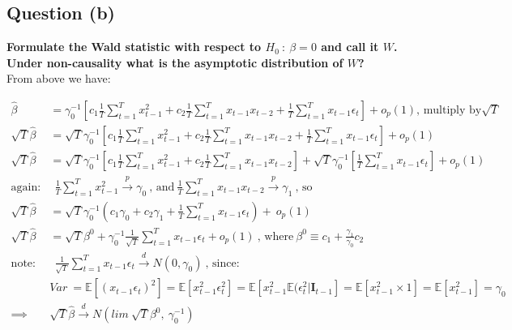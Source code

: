 \documentclass[11pt]{article}
\theoremstyle{definition}
\def\inprob{\stackrel{p}{\rightarrow}}
\def\indist{\stackrel{d}{\rightarrow}}
\begin{document}
\subsection{Question (b)}
\textbf{Formulate the Wald statistic with respect to $H_{0} \ : \ \beta=0$ and call it $W$.  Under non-causality what is the asymptotic distribution of $W$?} \\

From above we have:

\begin{equation*}
\begin{split}
\hat{\beta} & = \gamma_{0}^{-1}\left[c_{1}\frac{1}{T}\sum_{t=1}^{T}x_{t-1}^{2} + c_{2}\frac{1}{T}\sum_{t=1}^{T}x_{t-1}x_{t-2} + \frac{1}{T}\sum_{t=1}^{T}x_{t-1}\epsilon_{t}\right] + o_{p}(1) \text{, multiply by} \sqrt{T} \\
\sqrt{T}\hat{\beta} & =\sqrt{T} \gamma_{0}^{-1}\left[c_{1}\frac{1}{T}\sum_{t=1}^{T}x_{t-1}^{2} + c_{2}\frac{1}{T}\sum_{t=1}^{T}x_{t-1}x_{t-2} + \frac{1}{T}\sum_{t=1}^{T}x_{t-1}\epsilon_{t}\right] + o_{p}(1) \\
\sqrt{T}\hat{\beta} & =\sqrt{T} \gamma_{0}^{-1}\left[c_{1}\frac{1}{T}\sum_{t=1}^{T}x_{t-1}^{2} + c_{2}\frac{1}{T}\sum_{t=1}^{T}x_{t-1}x_{t-2} \right] + \sqrt{T} \gamma_{0}^{-1}\left[\frac{1}{T}\sum_{t=1}^{T}x_{t-1}\epsilon_{t}\right] + o_{p}(1) \\
 \text{again:} & \ \  \frac{1}{T}\sum_{t=1}^{T}x_{t-1}^{2} \inprob \gamma_{0} \ \text{, and} \  \frac{1}{T}\sum_{t=1}^{T}x_{t-1}x_{t-2} \inprob \gamma_{1} \ \text{, so} \\
\sqrt{T}\hat{\beta}  & = \sqrt{T}\gamma_{0}^{-1}\left(c_{1}\gamma_{0}+c_{2}\gamma_{1} + \frac{1}{T}\sum_{t=1}^{T}x_{t-1}\epsilon_{t}\right) + \ o_{p}(1)  \\
\sqrt{T}\hat{\beta} & =\sqrt{T} \beta^{0}+\gamma_{0}^{-1}\frac{1}{\sqrt{T}}\sum_{t=1}^{T}x_{t-1}\epsilon_{t}+ o_{p}(1) \ \text{, where} \ \beta^{0}\equiv c_{1}+\frac{\gamma_{1}}{\gamma_{0}}c_{2} \\
\text{note:} & \ \  \frac{1}{\sqrt{T}}\sum_{t=1}^{T}x_{t-1}\epsilon_{t} \indist N(0,\gamma_{0}) \ \text{, since:} \\
 & Var \ = \mathbb{E}\left[(x_{t-1}\epsilon_{t})^2\right]= \mathbb{E}\left[x_{t-1}^{2}\epsilon_{t}^{2}\right]=\mathbb{E}\left[x_{t-1}^{2}\mathbb{E}(\epsilon_{t}^{2}|\textbf{I}_{t-1}\right]= \mathbb{E}\left[x_{t-1}^{2}\times 1\right]=\mathbb{E}\left[x_{t-1}^{2}\right]=\gamma_{0} \\
 \implies & \sqrt{T}\hat{\beta} \indist N(lim \ \sqrt{T}\beta^{0}, \ \gamma_{0}^{-1}) \\

\end{split}
\end{equation*}
\end{document}

